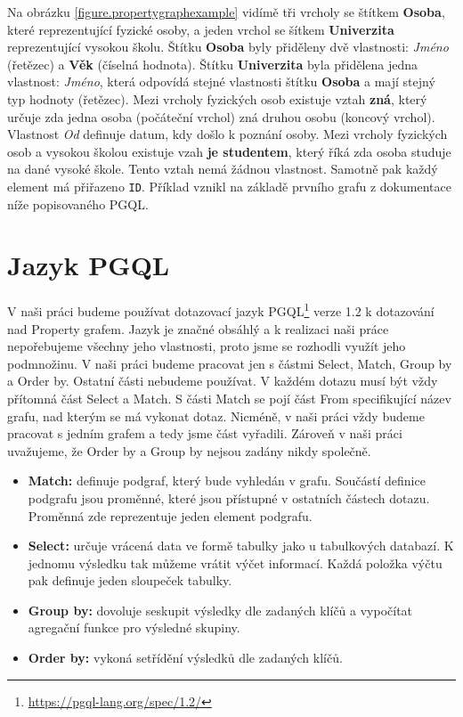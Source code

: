 Na obrázku \ref{figure.propertygraphexample} vidímě tři vrcholy se štítkem \textbf{Osoba}, které reprezentující fyzické osoby, a jeden vrchol se šítkem \textbf{Univerzita} reprezentující vysokou školu.
Štítku \textbf{Osoba} byly přiděleny dvě vlastnosti: \textit{Jméno} (řetězec) a \textbf{Věk} (číselná hodnota).
Štítku \textbf{Univerzita} byla přidělena jedna vlastnost: \textit{Jméno}, která odpovídá stejné vlastnosti štítku \textbf{Osoba} a mají stejný typ hodnoty (řetězec).
Mezi vrcholy fyzických osob existuje vztah \textbf{zná}, který určuje zda jedna osoba (počáteční vrchol) zná druhou osobu (koncový vrchol).
Vlastnost \textit{Od} definuje datum, kdy došlo k poznání osoby.
Mezi vrcholy fyzických osob a vysokou školou existuje vzah \textbf{je studentem}, který říká zda osoba studuje na dané vysoké škole.
Tento vztah nemá žádnou vlastnost.
Samotně pak každý element má přiřazeno \texttt{ID}.
Příklad vznikl na základě prvního grafu z dokumentace níže popisovaného PGQL.

\section{Jazyk PGQL}
\label{req.pgql}

V naši práci budeme používat dotazovací jazyk PGQL\footnote{\url{https://pgql-lang.org/spec/1.2/}} verze 1.2 k dotazování nad Property grafem.
Jazyk je značné obsáhlý a k realizaci naši práce nepořebujeme všechny jeho vlastnosti, proto jsme se rozhodli využít jeho podmnožinu.
V naši práci budeme pracovat jen s částmi Select, Match, Group by a Order by.
Ostatní části nebudeme používat.
V každém dotazu musí být vždy přítomná část Select a Match.
S části Match se pojí část From specifikující název grafu, nad kterým se má vykonat dotaz.
Nicméně, v naši práci vždy budeme pracovat s jedním grafem a tedy jsme část vyřadili. 
Zároveň v naši práci uvažujeme, že Order by a Group by nejsou zadány nikdy společně.

\begin{itemize}
\item \textbf{Match:} definuje podgraf, který bude vyhledán v grafu.
Součástí definice podgrafu jsou proměnné, které jsou přístupné v ostatních částech dotazu.
Proměnná zde reprezentuje jeden element podgrafu.

\item \textbf{Select:} určuje vrácená data ve formě tabulky jako u tabulkových databazí.
K jednomu výsledku tak můžeme vrátit výčet informací.
Každá položka výčtu pak definuje jeden sloupeček tabulky.

\item \textbf{Group by:} dovoluje seskupit výsledky dle zadaných klíčů a vypočítat agregační funkce pro výsledné skupiny.

\item \textbf{Order by:} vykoná setřídění výsledků dle zadaných klíčů.
\end{itemize}

